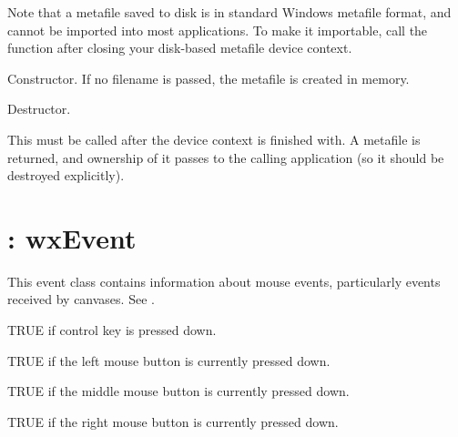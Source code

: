 Note that a metafile saved to disk is in standard Windows metafile format,
and cannot be imported into most applications. To make it importable,
call the function  after
closing your disk-based metafile device context.



Constructor. If no filename is passed, the metafile is created
in memory.



Destructor.

\label{wxmetafiledcclose}


This must be called after the device context is finished with. A
metafile is returned, and ownership of it passes to the calling
application (so it should be destroyed explicitly).

\section{: wxEvent}\label{wxmouseevent}

This event class contains information about mouse events, particularly
events received by canvases. See .



TRUE if control key is pressed down.



TRUE if the left mouse button is currently pressed down.



TRUE if the middle mouse button is currently pressed down.



TRUE if the right mouse button is currently pressed down.


